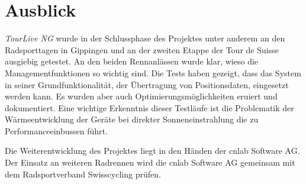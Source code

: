 \section*{Ausblick}
\textit{TourLive NG} wurde in der Schlussphase des Projektes unter anderem an den Radsporttagen in Gippingen und an der zweiten Etappe der Tour de Suisse ausgiebig getestet. An den beiden Rennanlässen wurde klar, wieso die Managementfunktionen so wichtig sind. Die Tests haben gezeigt, dass das System in seiner Grundfunktionalität, der Übertragung von Positionsdaten, eingesetzt werden kann. Es wurden aber auch Optimierungsmöglichkeiten eruiert und dokumentiert. Eine wichtige Erkenntnis dieser Testläufe ist die Problematik der Wärmeentwicklung der Geräte bei direkter Sonneneinstrahlung die zu Performanceeinbussen führt.

Die Weiterentwicklung des Projektes liegt in den Händen der cnlab Software AG. Der Einsatz an weiteren Radrennen wird die cnlab Software AG gemeinsam mit dem Radsportverband Swisscycling prüfen.

